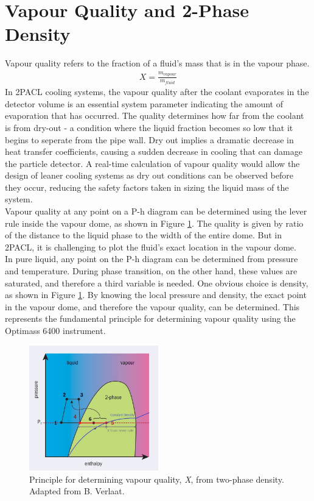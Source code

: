 \documentclass{report}
\begin{document}
\section{Vapour Quality and 2-Phase Density}
Vapour quality refers to the fraction of a fluid's mass that is in the vapour phase.
\begin{eqnarray}
X=\frac{m_{vapour}}{m_{fluid}}
\end{eqnarray}
In 2PACL cooling systems, the vapour quality after the coolant evaporates in the detector volume is an essential system parameter indicating the amount of evaporation that has occurred. The quality determines how far from the coolant is from dry-out - a condition where the liquid fraction becomes so low that it begins to seperate from the pipe wall. Dry out implies a dramatic decrease in heat transfer coefficients, causing a sudden decrease in cooling that can damage the particle detector. A real-time calculation of vapour quality would allow the design of leaner cooling systems as dry out conditions can be observed before they occur, reducing the safety factors taken in sizing the liquid mass of the system.\\
Vapour quality at any point on a P-h diagram can be determined using the lever rule inside the vapour dome, as shown in Figure \ref{fig:densityMethod}. The quality is given by ratio of the distance to the liquid phase to the width of the entire dome. But in 2PACL, it is challenging to plot the fluid's exact location in the vapour dome. \\
In pure liquid, any point on the P-h diagram can be determined from pressure and temperature. During phase transition, on the other hand, these values are saturated, and therefore a third variable is needed. One obvious choice is density, as shown in Figure \ref{fig:densityMethod}. By knowing the local pressure and density, the exact point in the vapour dome, and therefore the vapour quality, can be determined. This represents the fundamental principle for determining vapour quality using the Optimass 6400 instrument.

\begin{figure}
\includegraphics[width=0.5\textwidth]{densityMethod.jpg}
\caption{Principle for determining vapour quality, \textit{X}, from two-phase density. Adapted from B. Verlaat. \cite{CERN courier}}
\label{fig:densityMethod}
\end{figure}
\FloatBarrier
\end{document}
